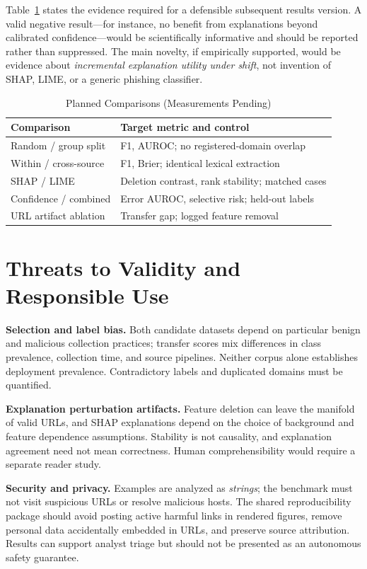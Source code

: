 \documentclass[conference,letterpaper]{IEEEtran}
\begin{document}
Table~\ref{tab:matrix} states the evidence required for a defensible subsequent results version. A valid negative result---for instance, no benefit from explanations beyond calibrated confidence---would be scientifically informative and should be reported rather than suppressed. The main novelty, if empirically supported, would be evidence about \emph{incremental explanation utility under shift}, not invention of SHAP, LIME, or a generic phishing classifier.

\begin{table}[!t]
\caption{Planned Comparisons (Measurements Pending)}\label{tab:matrix}
\centering\footnotesize\setlength{\tabcolsep}{3pt}
\begin{tabular}{@{}p{}p{}@{}}
\toprule
Comparison & Target metric and control\\
\midrule
Random / group split & F1, AUROC; no registered-domain overlap\\
Within / cross-source & F1, Brier; identical lexical extraction\\
SHAP / LIME & Deletion contrast, rank stability; matched cases\\
Confidence / combined & Error AUROC, selective risk; held-out labels\\
URL artifact ablation & Transfer gap; logged feature removal\\
\bottomrule
\end{tabular}
\end{table}

\section{Threats to Validity and Responsible Use}
\textbf{Selection and label bias.} Both candidate datasets depend on particular benign and malicious collection practices; transfer scores mix differences in class prevalence, collection time, and source pipelines. Neither corpus alone establishes deployment prevalence. Contradictory labels and duplicated domains must be quantified.

\textbf{Explanation perturbation artifacts.} Feature deletion can leave the manifold of valid URLs, and SHAP explanations depend on the choice of background and feature dependence assumptions. Stability is not causality, and explanation agreement need not mean correctness. Human comprehensibility would require a separate reader study.

\textbf{Security and privacy.} Examples are analyzed as \emph{strings}; the benchmark must not visit suspicious URLs or resolve malicious hosts. The shared reproducibility package should avoid posting active harmful links in rendered figures, remove personal data accidentally embedded in URLs, and preserve source attribution. Results can support analyst triage but should not be presented as an autonomous safety guarantee.
\end{document}
